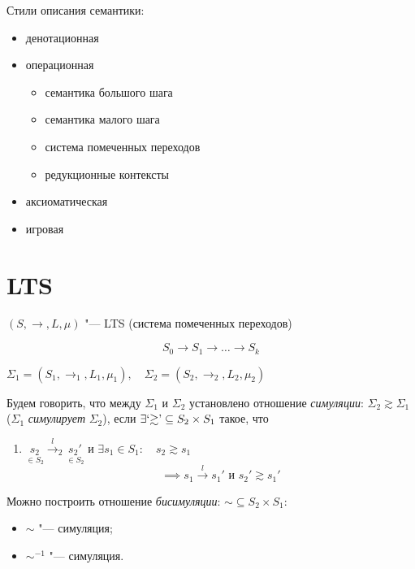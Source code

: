 Стили описания семантики:
\begin{itemize}
	\item денотационная
	\item операционная
		\begin{itemize}
			\item семантика большого шага
			\item семантика малого шага
			\item система помеченных переходов
			\item редукционные контексты
		\end{itemize}
	\item аксиоматическая
	\item игровая
\end{itemize}

\section{LTS}

$ (S, \to, L, \mu) $ "--- LTS (система помеченных переходов)

$$ S_0 \to S_1 \to \dots \to S_k $$

\begin{definition}
	$ \Sigma_1 = (S_1, \to_1, L_1, \mu_1), \quad \Sigma_2 = (S_2, \to_2, L_2, \mu_2) $

	Будем говорить, что между $ \Sigma_1 $ и $ \Sigma_2 $ установлено отношение \emph{симуляции}:
	$ \Sigma_2 \gtrsim \Sigma_1 $ ($ \Sigma_1 $ \emph{симулирует} $ \Sigma_2 $), если
	$ \exists \text{`$ \gtrsim $'} \subseteq S_2 \times S_1 $ такое, что
	\begin{enumerate}
		\item $ \underset{\in S_2}{s_2} \xrightarrow{l}_2 \underset{\in S_2}{s_2'} $ и
			$ \exists s_1 \in S_1 : \quad s_2 \gtrsim s_1 $
			$$ \implies s_1 \xrightarrow{l} s_1' \text{ и } s_2' \gtrsim s_1' $$
	\end{enumerate}
\end{definition}

\begin{definition}
	Можно построить отношение \emph{бисимуляции}: $ \sim \subseteq S_2 \times S_1 $:
	\begin{itemize}
		\item $ \sim $ "--- симуляция;
		\item $ \sim^{-1} $ "--- симуляция.
	\end{itemize}
\end{definition}

